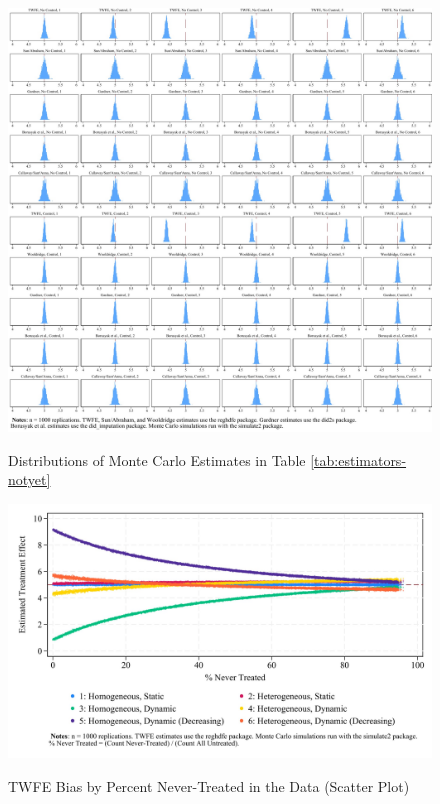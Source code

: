 \documentclass[12pt]{article}
\begin{document}
\begin{figure}[H]
    \centering
    \caption{Distributions of Monte Carlo Estimates in Table \ref{tab:estimators-notyet}}
    \includegraphics[width=6in]{Figures/Histograms of Monte Carlo Estimates 2.jpg}
    \label{fig:hist2}
\end{figure}

\begin{figure}
    \centering
    \caption{TWFE Bias by Percent Never-Treated in the Data (Scatter Plot)}
    \includegraphics[width=5in]{Figures/TWFE Bias by Percent Never Treated Scatter.jpg}
    \label{fig:scatter-nevertreat}
\end{figure}
\end{document}
